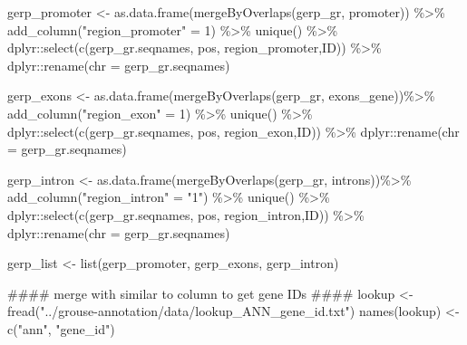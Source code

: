 \documentclass[
  letterpaper,
  DIV=11,
  numbers=noendperiod]{scrreprt}
\newenvironment{Shaded}{}{}
\newcommand{\AttributeTok}[1]{\textcolor[rgb]{0.84,0.23,0.29}{#1}}
\newcommand{\DecValTok}[1]{\textcolor[rgb]{0.00,0.36,0.77}{#1}}
\newcommand{\DocumentationTok}[1]{\textcolor[rgb]{0.42,0.45,0.49}{#1}}
\newcommand{\FunctionTok}[1]{\textcolor[rgb]{0.44,0.26,0.76}{#1}}
\newcommand{\NormalTok}[1]{\textcolor[rgb]{0.14,0.16,0.18}{#1}}
\newcommand{\OtherTok}[1]{\textcolor[rgb]{0.44,0.26,0.76}{#1}}
\newcommand{\SpecialCharTok}[1]{\textcolor[rgb]{0.00,0.36,0.77}{#1}}
\newcommand{\StringTok}[1]{\textcolor[rgb]{0.01,0.18,0.38}{#1}}
\begin{document}
\begin{Shaded}
\begin{Highlighting}[]
\NormalTok{gerp\_promoter }\OtherTok{\textless{}{-}} \FunctionTok{as.data.frame}\NormalTok{(}\FunctionTok{mergeByOverlaps}\NormalTok{(gerp\_gr, promoter)) }\SpecialCharTok{\%\textgreater{}\%}
  \FunctionTok{add\_column}\NormalTok{(}\StringTok{"region\_promoter"} \OtherTok{=} \DecValTok{1}\NormalTok{) }\SpecialCharTok{\%\textgreater{}\%} \FunctionTok{unique}\NormalTok{() }\SpecialCharTok{\%\textgreater{}\%}\NormalTok{ dplyr}\SpecialCharTok{::}\FunctionTok{select}\NormalTok{(}\FunctionTok{c}\NormalTok{(}\StringTok{\textasciigrave{}}\AttributeTok{gerp\_gr.seqnames}\StringTok{\textasciigrave{}}\NormalTok{, pos, region\_promoter,ID)) }\SpecialCharTok{\%\textgreater{}\%}\NormalTok{ dplyr}\SpecialCharTok{::}\FunctionTok{rename}\NormalTok{(}\AttributeTok{chr =}\NormalTok{ gerp\_gr.seqnames)}

\NormalTok{gerp\_exons }\OtherTok{\textless{}{-}} \FunctionTok{as.data.frame}\NormalTok{(}\FunctionTok{mergeByOverlaps}\NormalTok{(gerp\_gr, exons\_gene))}\SpecialCharTok{\%\textgreater{}\%}
  \FunctionTok{add\_column}\NormalTok{(}\StringTok{"region\_exon"} \OtherTok{=} \DecValTok{1}\NormalTok{) }\SpecialCharTok{\%\textgreater{}\%} \FunctionTok{unique}\NormalTok{() }\SpecialCharTok{\%\textgreater{}\%}\NormalTok{ dplyr}\SpecialCharTok{::}\FunctionTok{select}\NormalTok{(}\FunctionTok{c}\NormalTok{(gerp\_gr.seqnames, pos, region\_exon,ID)) }\SpecialCharTok{\%\textgreater{}\%}\NormalTok{ dplyr}\SpecialCharTok{::}\FunctionTok{rename}\NormalTok{(}\AttributeTok{chr =}\NormalTok{ gerp\_gr.seqnames)}

\NormalTok{gerp\_intron }\OtherTok{\textless{}{-}} \FunctionTok{as.data.frame}\NormalTok{(}\FunctionTok{mergeByOverlaps}\NormalTok{(gerp\_gr, introns))}\SpecialCharTok{\%\textgreater{}\%}
  \FunctionTok{add\_column}\NormalTok{(}\StringTok{"region\_intron"} \OtherTok{=} \StringTok{"1"}\NormalTok{) }\SpecialCharTok{\%\textgreater{}\%} \FunctionTok{unique}\NormalTok{() }\SpecialCharTok{\%\textgreater{}\%}\NormalTok{ dplyr}\SpecialCharTok{::}\FunctionTok{select}\NormalTok{(}\FunctionTok{c}\NormalTok{(gerp\_gr.seqnames, pos, region\_intron,ID)) }\SpecialCharTok{\%\textgreater{}\%}\NormalTok{ dplyr}\SpecialCharTok{::}\FunctionTok{rename}\NormalTok{(}\AttributeTok{chr =}\NormalTok{ gerp\_gr.seqnames)}


\NormalTok{gerp\_list }\OtherTok{\textless{}{-}} \FunctionTok{list}\NormalTok{(gerp\_promoter, gerp\_exons, gerp\_intron)}

\DocumentationTok{\#\#\#\# merge with \textquotesingle{}similar to\textquotesingle{} column to get gene IDs \#\#\#\#}
\NormalTok{lookup }\OtherTok{\textless{}{-}} \FunctionTok{fread}\NormalTok{(}\StringTok{"../grouse{-}annotation/data/lookup\_ANN\_gene\_id.txt"}\NormalTok{)}
\FunctionTok{names}\NormalTok{(lookup) }\OtherTok{\textless{}{-}} \FunctionTok{c}\NormalTok{(}\StringTok{"ann"}\NormalTok{, }\StringTok{"gene\_id"}\NormalTok{)}


\end{Highlighting}
\end{Shaded}
\end{document}
